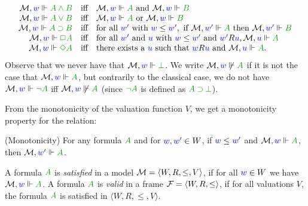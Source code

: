 \begin{equation}\label{eq:kripke}
	\begin{array}{rcl}
		\M, \lb w \Vdash \fm{A \AND B} & \mbox{iff} & \M, \lb w \Vdash \fm A \mbox{ and } \M, \lb w \Vdash \fm B\\
		
		\M, \lb w \Vdash \fm{A \OR B} & \mbox{iff} & \M, \lb w \Vdash \fm A \mbox{ or } \M, \lb w \Vdash \fm B\\
	
		\M, \lb w \Vdash \fm{A \IMP B} & \mbox{iff} & \mbox{for all } \lb{w'} \mbox{ with } \futs w{w'}, \mbox{ if } \M, \lb{w'} \Vdash \fm A \mbox{ then } \M, \lb{w'} \Vdash \fm B\\
		
		\M, \lb w \Vdash \fm{\BOX A} & \mbox{iff} & \mbox{for all } \lb{w'} \mbox{ and } \lb u \mbox{ with } \futs w{w'} \mbox{ and } \accs {w'}u, \M, \lb u \Vdash \fm A \hfill \\ %
		
		\M, \lb w \Vdash \fm{\DIA A} & \mbox{iff} & \mbox{there exists a } \lb u \mbox{ such that } \accs wu \mbox{ and } \M, \lb u \Vdash \fm A.
		
	\end{array}
\end{equation}
Observe that we never have that $\M, \lb w \Vdash \fm\bot$. 
%
We write $\M, \lb w \not\Vdash \fm A$ if it is not the case that $\M, \lb w \Vdash \fm A$, but contrarily to the classical case, we do not have $\M, \lb w \Vdash \fm{\neg A}$ iff $\M, \lb w \not\Vdash \fm A$ (since $\fm{\neg A}$ is defined as $\fm{A \IMP \bot}$).

From the monotonicity of the valuation function $V$, we get a monotonicity property for the relation:
\begin{proposition}(Monotonicity) 
	For any formula $\fm A$ and for ${\color{blue}{w}}, {\color{blue}{w'}} \in W$, if ${\color{blue}{w}}\le{{\color{blue}{w'}}}$ and $\M, \lb w \Vdash \fm A$, then $\M, \lb{w'} \Vdash \fm A$.
\end{proposition}



\begin{definition}
	A formula $\fm A$ is \emph{satisfied} in a model $\mathcal{M} = \langle W, R, \le, V \rangle$, if for all ${\color{blue}{w}} \in W$ we have $\M, \lb w \Vdash \fm A$.
	A formula $\fm A$ is \emph{valid} in a frame $\mathcal{F} = \langle W, R, \le \rangle$, if for all valuations $V$, the formula $\fm A$ is satisfied in $\langle W, R, \le, V \rangle$.
\end{definition}



